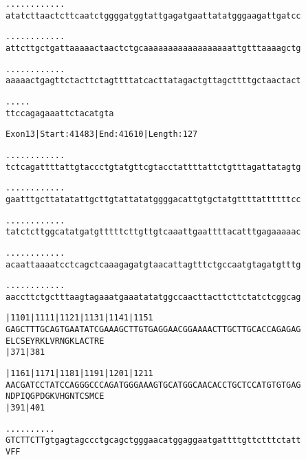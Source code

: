 \documentclass{article}
\begin{document}
\newpage
\begin{alltt}
 .    .    .    .    .    .    .    .    .    .    .    .
atatcttaactcttcaatctggggatggtattgagatgaattatatgggaagattgatcc



 .    .    .    .    .    .    .    .    .    .    .    .
attcttgctgattaaaaactaactctgcaaaaaaaaaaaaaaaaaattgtttaaaagctg



 .    .    .    .    .    .    .    .    .    .    .    .
aaaaactgagttctacttctagttttatcacttatagactgttagcttttgctaactact



 .    .    .    .    .
ttccagagaaattctacatgta


\end{alltt}
\newpage
\begin{alltt}
Exon 13 | Start: 41483 | End: 41610 | Length: 127

.    .    .    .    .    .    .    .    .    .    .    .
tctcagattttattgtaccctgtatgttcgtacctattttattctgtttagattatagtg



.    .    .    .    .    .    .    .    .    .    .    .
gaatttgcttatatattgcttgtattatatggggacattgtgctatgttttattttttcc



.    .    .    .    .    .    .    .    .    .    .    .
tatctcttggcatatgatgtttttcttgttgtcaaattgaattttacatttgagaaaaac



.    .    .    .    .    .    .    .    .    .    .    .
acaattaaaatcctcagctcaaagagatgtaacattagtttctgccaatgtagatgtttg



.    .    .    .    .    .    .    .    .    .    .    .
aaccttctgctttaagtagaaatgaaatatatggccaacttacttcttctatctcggcag



        |1101     |1111     |1121     |1131     |1141     |1151
GAGCTTTGCAGTGAATATCGAAAGCTTGTGAGGAACGGAAAACTTGCTTGCACCAGAGAG
E  L  C  S  E  Y  R  K  L  V  R  N  G  K  L  A  C  T  R  E
                  |371                          |381

        |1161     |1171     |1181     |1191     |1201     |1211
AACGATCCTATCCAGGGCCCAGATGGGAAAGTGCATGGCAACACCTGCTCCATGTGTGAG
N  D  P  I  Q  G  P  D  G  K  V  H  G  N  T  C  S  M  C  E
                  |391                          |401

            .    .    .    .    .    .    .    .    .    .
GTCTTCTTgtgagtagccctgcagctgggaacatggaggaatgattttgttctttctatt
V  F  F


\end{alltt}
\end{document}
